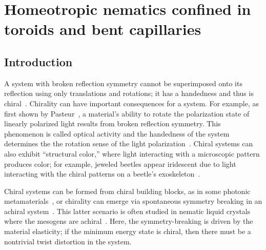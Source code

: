 \chapter{Homeotropic nematics confined in toroids and bent capillaries}

\section{Introduction}
A system with broken reflection symmetry cannot be superimposed onto its reflection using only translations and rotations; it has a handedness and thus is chiral~\cite{RN175}.
Chirality can have important consequences for a system.
For example, as first shown by Pasteur~\cite{RN291}, a material's ability to rotate the polarization state of linearly polarized light results from broken reflection symmetry.
This phenomenon is called optical activity and the handedness of the system determines the the rotation sense of the light polarization~\cite{RN291}.
Chiral systems can also exhibit ``structural color,'' where light interacting with a microscopic pattern produces color; for example, jeweled beetles appear iridescent due to light interacting with the chiral patterns on a beetle's exoskeleton~\cite{RN308,RN307}.

Chiral systems can be formed from chiral building blocks, as in some photonic metamaterials~\cite{RN304,metameterial}, or chirality can emerge via spontaneous symmetry breaking in an achiral system~\cite{RN294}.
This latter scenario is often studied in nematic liquid crystals where the mesogens are achiral~\cite{RN297,RN296,RN298,RN295,RN299,RN193,RN24,RN192,RN191,RN293,RN302}.
Here, the symmetry-breaking is driven by the material elasticity; if the minimum energy state is chiral, then there must be a nontrivial twist distortion in the system.

